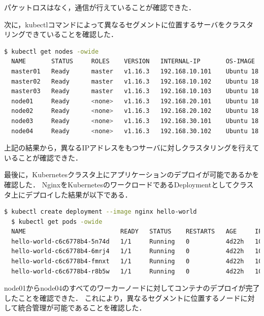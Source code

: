 パケットロスはなく，通信が行えていることが確認できた．

次に，kubectlコマンドによって異なるセグメントに位置するサーバをクラスタリングできていることを確認した．

\begin{lstlisting}[language=bash]
  $ kubectl get nodes -owide
  NAME       STATUS     ROLES    VERSION   INTERNAL-IP       OS-IMAGE             KERNEL-VERSION      CONTAINER-RUNTIME
  master01   Ready      master   v1.16.3   192.168.10.101    Ubuntu 18.04.3 LTS   4.15.0-70-generic   docker://18.9.7
  master02   Ready      master   v1.16.3   192.168.10.102    Ubuntu 18.04.3 LTS   4.15.0-70-generic   docker://18.9.7
  master03   Ready      master   v1.16.3   192.168.10.103    Ubuntu 18.04.3 LTS   4.15.0-70-generic   docker://18.9.7
  node01     Ready      <none>   v1.16.3   192.168.20.101    Ubuntu 18.04.3 LTS   4.15.0-74-generic   docker://18.9.7
  node02     Ready      <none>   v1.16.3   192.168.20.102    Ubuntu 18.04.3 LTS   4.15.0-74-generic   docker://18.9.7
  node03     Ready      <none>   v1.16.3   192.168.30.101    Ubuntu 18.04.3 LTS   4.15.0-74-generic   docker://18.9.7
  node04     Ready      <none>   v1.16.3   192.168.30.102    Ubuntu 18.04.3 LTS   4.15.0-74-generic   docker://18.9.7
\end{lstlisting}

上記の結果から，異なるIPアドレスをもつサーバに対しクラスタリングを行えていることが確認できた．

最後に，Kubernetesクラスタ上にアプリケーションのデプロイが可能であるかを確認した．
NginxをKubernetesのワークロードであるDeploymentとしてクラスタ上にデプロイした結果が以下である．

\begin{lstlisting}[language=bash]
  $ kubectl create deployment --image nginx hello-world
  $ kubectl get pods -owide
  NAME                          READY   STATUS    RESTARTS   AGE     IP          NODE       NOMINATED NODE   READINESS GATES
  hello-world-c6c6778b4-5n74d   1/1     Running   0          4d22h   10.44.0.1   node01     <none>           <none>
  hello-world-c6c6778b4-6mrj4   1/1     Running   0          4d22h   10.42.0.1   node03     <none>           <none>
  hello-world-c6c6778b4-fmnxt   1/1     Running   0          4d22h   10.47.0.1   node02     <none>           <none>
  hello-world-c6c6778b4-r8b5w   1/1     Running   0          4d22h   10.44.0.2   node04     <none>           <none>
\end{lstlisting}

node01からnode04のすべてのワーカーノードに対してコンテナのデプロイが完了したことを確認できた．
これにより，異なるセグメントに位置するノードに対して統合管理が可能であることを確認した．

